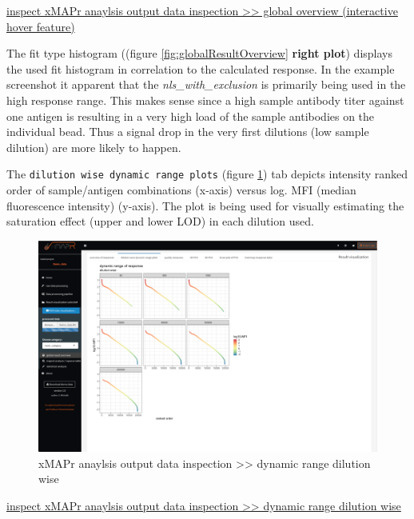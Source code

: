 \documentclass[
]{book}
\begin{document}
\href{figures/global_result_overview1.png}{inspect xMAPr anaylsis output data inspection \textgreater\textgreater{} global overview (interactive hover feature)}

The fit type histogram ((figure \ref{fig:globalResultOverview} \textbf{right plot}) displays the used fit histogram in correlation to the calculated response. In the example screenshot it apparent that the \emph{nls\_with\_exclusion} is primarily being used in the high response range. This makes sense since a high sample antibody titer against one antigen is resulting in a very high load of the sample antibodies on the individual bead. Thus a signal drop in the very first dilutions (low sample dilution) are more likely to happen.

The \texttt{dilution\ wise\ dynamic\ range\ plots} (figure \ref{fig:dynamicRangeDilutionWise}) tab depicts intensity ranked order of sample/antigen combinations (x-axis) versus log. MFI (median fluorescence intensity) (y-axis). The plot is being used for visually estimating the saturation effect (upper and lower LOD) in each dilution used.

\begin{figure}

{\centering \includegraphics[width=50.5in]{figures/global_result_overview_dyn_range_dilution_wise} 

}

\caption{xMAPr anaylsis output data inspection >> dynamic range dilution wise}\label{fig:dynamicRangeDilutionWise}
\end{figure}

\href{figures/global_result_overview_dyn_range_dilution_wise.png}{inspect xMAPr anaylsis output data inspection \textgreater\textgreater{} dynamic range dilution wise}
\end{document}
